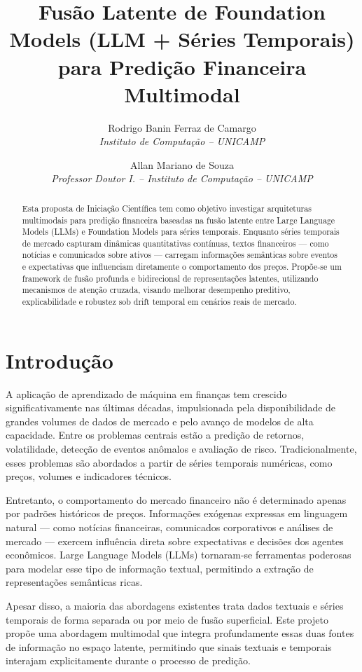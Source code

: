 \documentclass[11pt, a4paper]{article}
\title{Fusão Latente de Foundation Models (LLM + Séries Temporais) para Predição Financeira Multimodal}
\author{
Rodrigo Banin Ferraz de Camargo\\
\textit{Instituto de Computação -- UNICAMP}
\and
Allan Mariano de Souza\\
\textit{Professor Doutor I. -- Instituto de Computação -- UNICAMP}
}
\begin{document}
\maketitle

\begin{abstract}
Esta proposta de Iniciação Científica tem como objetivo investigar arquiteturas multimodais para predição financeira baseadas na fusão latente entre Large Language Models (LLMs) e Foundation Models para séries temporais. Enquanto séries temporais de mercado capturam dinâmicas quantitativas contínuas, textos financeiros — como notícias e comunicados sobre ativos — carregam informações semânticas sobre eventos e expectativas que influenciam diretamente o comportamento dos preços. Propõe-se um framework de fusão profunda e bidirecional de representações latentes, utilizando mecanismos de atenção cruzada, visando melhorar desempenho preditivo, explicabilidade e robustez sob drift temporal em cenários reais de mercado.
\end{abstract}

\section{Introdução}

A aplicação de aprendizado de máquina em finanças tem crescido significativamente nas últimas décadas, impulsionada pela disponibilidade de grandes volumes de dados de mercado e pelo avanço de modelos de alta capacidade. Entre os problemas centrais estão a predição de retornos, volatilidade, detecção de eventos anômalos e avaliação de risco. Tradicionalmente, esses problemas são abordados a partir de séries temporais numéricas, como preços, volumes e indicadores técnicos.

Entretanto, o comportamento do mercado financeiro não é determinado apenas por padrões históricos de preços. Informações exógenas expressas em linguagem natural — como notícias financeiras, comunicados corporativos e análises de mercado — exercem influência direta sobre expectativas e decisões dos agentes econômicos. Large Language Models (LLMs) tornaram-se ferramentas poderosas para modelar esse tipo de informação textual, permitindo a extração de representações semânticas ricas.

Apesar disso, a maioria das abordagens existentes trata dados textuais e séries temporais de forma separada ou por meio de fusão superficial. Este projeto propõe uma abordagem multimodal que integra profundamente essas duas fontes de informação no espaço latente, permitindo que sinais textuais e temporais interajam explicitamente durante o processo de predição.
\end{document}
